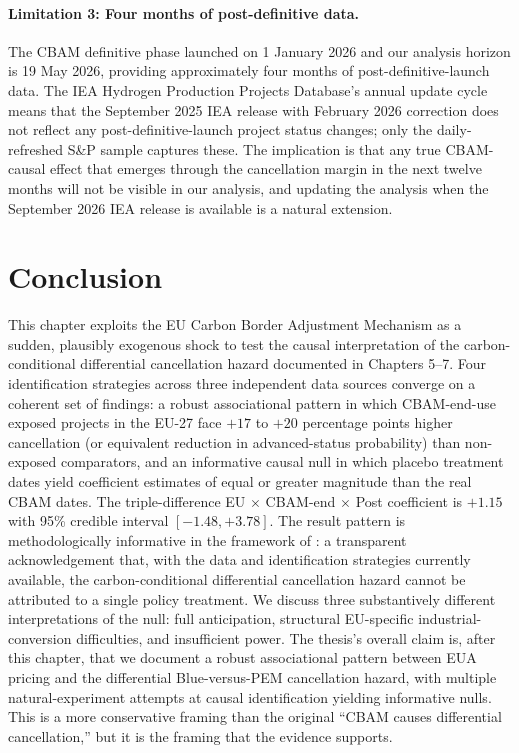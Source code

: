 \documentclass[11pt,a4paper]{article}
\begin{document}
\paragraph{Limitation 3: Four months of post-definitive data.}
The CBAM definitive phase launched on 1 January 2026 and our analysis horizon is 19 May 2026, providing approximately four months of post-definitive-launch data. The IEA Hydrogen Production Projects Database's annual update cycle means that the September 2025 IEA release with February 2026 correction does not reflect any post-definitive-launch project status changes; only the daily-refreshed S\&P sample captures these. The implication is that any true CBAM-causal effect that emerges through the cancellation margin in the next twelve months will not be visible in our analysis, and updating the analysis when the September 2026 IEA release is available is a natural extension.

\section{Conclusion}
\label{sec:ch8-conclusion}

This chapter exploits the EU Carbon Border Adjustment Mechanism as a sudden, plausibly exogenous shock to test the causal interpretation of the carbon-conditional differential cancellation hazard documented in Chapters 5--7. Four identification strategies across three independent data sources converge on a coherent set of findings: a robust associational pattern in which CBAM-end-use exposed projects in the EU-27 face $+17$ to $+20$ percentage points higher cancellation (or equivalent reduction in advanced-status probability) than non-exposed comparators, and an informative causal null in which placebo treatment dates yield coefficient estimates of equal or greater magnitude than the real CBAM dates. The triple-difference EU $\times$ CBAM-end $\times$ Post coefficient is $+1.15$ with 95\% credible interval $[-1.48, +3.78]$. The result pattern is methodologically informative in the framework of \citet{ketel2023unimportance}: a transparent acknowledgement that, with the data and identification strategies currently available, the carbon-conditional differential cancellation hazard cannot be attributed to a single policy treatment. We discuss three substantively different interpretations of the null: full anticipation, structural EU-specific industrial-conversion difficulties, and insufficient power. The thesis's overall claim is, after this chapter, that we document a robust associational pattern between EUA pricing and the differential Blue-versus-PEM cancellation hazard, with multiple natural-experiment attempts at causal identification yielding informative nulls. This is a more conservative framing than the original ``CBAM causes differential cancellation,'' but it is the framing that the evidence supports.
\end{document}
